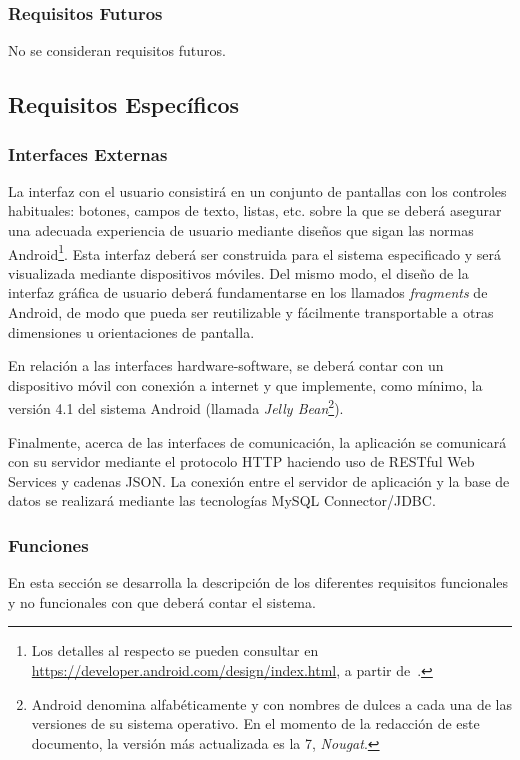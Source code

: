 \subsubsection{Requisitos Futuros}

No se consideran requisitos futuros.

\subsection{Requisitos Específicos}

\subsubsection{Interfaces Externas}

La interfaz con el usuario consistirá en un conjunto de pantallas con los controles habituales: botones, campos de texto, listas, etc. sobre la que se deberá asegurar una adecuada experiencia de usuario mediante diseños que sigan las normas Android\footnote{Los detalles al respecto se pueden consultar en \url{https://developer.android.com/design/index.html}, a partir de~\cite{AnDev}.}. Esta interfaz deberá ser construida para el sistema especificado y será visualizada mediante dispositivos móviles. Del mismo modo, el diseño de la interfaz gráfica de usuario deberá fundamentarse en los llamados \emph{fragments} de Android, de modo que pueda ser reutilizable y fácilmente transportable a otras dimensiones u orientaciones de pantalla.

En relación a las interfaces hardware-software, se deberá contar con un dispositivo móvil con conexión a internet y que implemente, como mínimo, la versión 4.1 del sistema Android (llamada \emph{Jelly Bean}\footnote{Android denomina alfabéticamente y con nombres de dulces a cada una de las versiones de su sistema operativo. En el momento de la redacción de este documento, la versión más actualizada es la 7, \textit{Nougat}.}).

Finalmente, acerca de las interfaces de comunicación, la aplicación se comunicará con su servidor mediante el protocolo HTTP haciendo uso de RESTful Web Services y cadenas JSON. La conexión entre el servidor de aplicación y la base de datos se realizará mediante las tecnologías MySQL Connector/JDBC.
\subsubsection{Funciones}

En esta sección se desarrolla la descripción de los diferentes requisitos funcionales y no funcionales con que deberá contar el sistema. 

